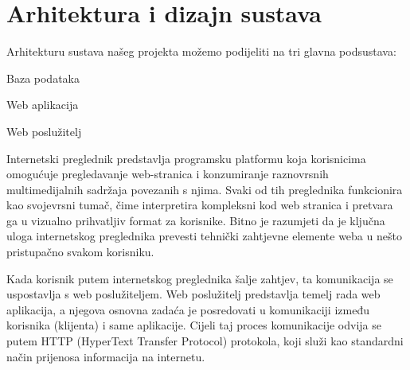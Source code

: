\chapter{Arhitektura i dizajn sustava}

	
	Arhitekturu sustava našeg projekta možemo podijeliti na tri glavna podsustava:
	
	\begin{packed_enum}
	
		\item Baza podataka
		\item Web aplikacija
		\item Web poslužitelj
							
	\end{packed_enum}
	
	Internetski preglednik predstavlja programsku platformu koja korisnicima omogućuje pregledavanje web-stranica i konzumiranje raznovrsnih multimedijalnih sadržaja povezanih s njima. Svaki od tih preglednika funkcionira kao svojevrsni tumač, čime interpretira kompleksni kod web stranica i pretvara ga u vizualno prihvatljiv format za korisnike. Bitno je razumjeti da je ključna uloga internetskog preglednika prevesti tehnički zahtjevne  elemente weba u nešto pristupačno svakom korisniku.
	
	Kada korisnik putem internetskog preglednika šalje zahtjev, ta komunikacija se uspostavlja s web poslužiteljem. Web poslužitelj predstavlja temelj rada web aplikacija, a njegova osnovna zadaća je posredovati u komunikaciji između korisnika (klijenta) i same aplikacije. Cijeli taj proces komunikacije odvija se putem HTTP (HyperText Transfer Protocol) protokola, koji služi kao standardni način prijenosa informacija na internetu.

